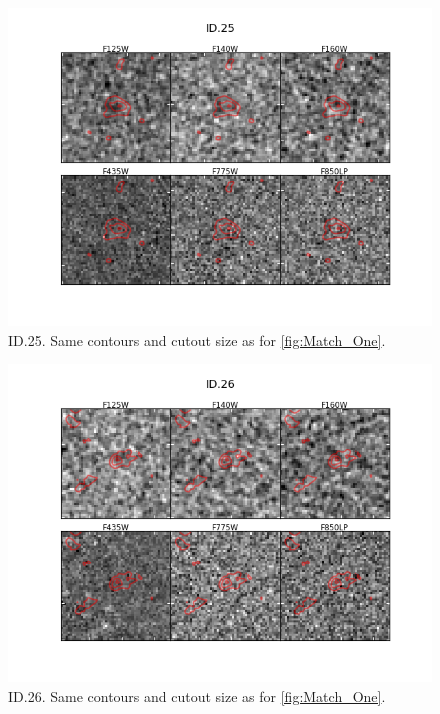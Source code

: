 \begin{figure}[tbp]
\centering \includegraphics[width=160mm]{Matched/ASPECS_Cutout_24.png}
\caption{ID.25. Same contours and cutout size as for \ref{fig:Match_One}.}
\label{fig:Match_Three}
\end{figure}

\begin{figure}[tbp]
\centering \includegraphics[width=160mm]{Matched/ASPECS_Cutout_25.png}
\caption{ID.26. Same contours and cutout size as for \ref{fig:Match_One}.}
\label{fig:Match_Three}
\end{figure}

